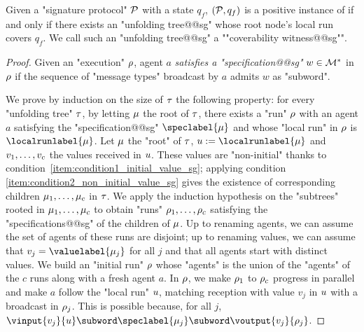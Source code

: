 \begin{lemma}
\label{lem:coverability_witness_sg}
Given a "signature protocol" $\mathcal{P}$ with a state $q_f$, $(\mathcal{P},q_f)$ is a positive instance of \COVER if and only if there exists an "unfolding tree@@sg" whose root node's local run covers $q_f$. We call such an "unfolding tree@@sg" a ""coverability witness@@sg"".
\end{lemma}
\begin{proof}
Given an "execution" $\rho$, agent $a$ \emph{satisfies a "specification@@sg"} $w \in \mathcal{M}^*$ in $\rho$ if the sequence of "message types" broadcast by $a$ admits $w$ as "subword".%

We prove by induction on the size of $\tau$ the following property: for every "unfolding tree" $\tau$, by letting $\mu$ the root of $\tau$, there exists a "run" $\rho$ with an agent $a$ satisfying the "specification@@sg" $\speclabel{\node}$ and whose "local run" in $\rho$ is $\localrunlabel{\node}$. Let $\mu$ the "root" of $\tau$, $\localrun := \localrunlabel{\node}$ and $v_1, \dots, v_c$ the values received in $u$. These values are "non-initial" thanks to condition~\ref{item:condition1_initial_value_sg}; applying condition \ref{item:condition2_non_initial_value_sg} gives the existence of corresponding children $\mu_1, \dots, \mu_c$ in $\tau$. We apply the induction hypothesis on the "subtrees" rooted in $\mu_1, \dots, \mu_c$ to obtain "runs" $\rho_1, \dots, \rho_c$ satisfying the "specifications@@sg" of the children of $\mu$. Up to renaming agents, we can assume the set of agents of these runs are disjoint; up to renaming values, we can assume that $\aval_j = \valuelabel{\node_j}$ for all $j$ and that all agents start with distinct values. We build an "initial run" $\rho$ whose "agents" is the union of the "agents" of the $c$ runs along with a fresh agent $a$. In $\rho$, we make $\rho_1$ to $\rho_c$ progress in parallel and make $a$ follow the "local run" $u$, matching reception with value $v_j$ in $u$ with a broadcast in $\rho_j$. This is possible because, for all $j$, $\vinput{v_j}{\localrun} \subword \speclabel{\node_j} \subword \voutput{v_j}{\run_j}$. 


\end{proof}
